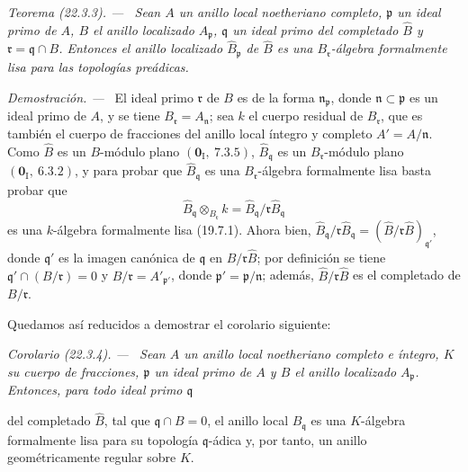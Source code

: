 \documentclass[10pt,oneside]{book}
\makeatletter
\newcommand{\setmanualcurrentlabel}[1]{\def\@currentlabel{#1}}
\newcommand{\oldpage}[2][]{%
  \setcounter{footnote}{0}%
  \marginpar{\scriptsize\textbf{#1}~|~#2}\ignorespaces}
\newenvironment{theorem}[1][]{%
  \setmanualcurrentlabel{#1}\par\medskip\noindent\itshape Teorema (#1). ---\ }{\par}
\newenvironment{corollary}[1][]{%
  \setmanualcurrentlabel{#1}\par\medskip\noindent\itshape Corolario (#1). ---\ }{\par}
\newenvironment{proof}{%
  \par\medskip\noindent\textit{Demostración. ---\ }}{\par}
\makeatother
\begin{document}
\begin{theorem}[22.3.3]
\label{0.22.3.3-es}
Sean $A$ un anillo local noetheriano \textup{completo}, $\mathfrak p$ un ideal primo
de $A$, $B$ el anillo localizado $A_\mathfrak p$, $\mathfrak q$ un ideal
primo del completado $\widehat B$ y $\mathfrak r=\mathfrak q\cap B$.
Entonces el anillo localizado $\widehat B_\mathfrak p$ de $\widehat B$ es una
$B_\mathfrak r$-álgebra formalmente lisa para las topologías preádicas.
\end{theorem}

\begin{proof}
El ideal primo $\mathfrak r$ de $B$ es de la forma
$\mathfrak n_\mathfrak p$, donde $\mathfrak n\subset\mathfrak p$ es un ideal
primo de $A$, y se tiene $B_\mathfrak r=A_\mathfrak n$; sea $k$ el cuerpo
residual de $B_\mathfrak r$, que es también el cuerpo de fracciones del anillo
local íntegro y completo $A'=A/\mathfrak n$. Como $\widehat B$ es un
$B$-módulo plano $(\mathbf 0_\mathrm I,~7.3.5)$,
$\widehat B_\mathfrak q$ es un $B_\mathfrak r$-módulo plano
$(\mathbf 0_\mathrm I,~6.3.2)$, y para probar que
$\widehat B_\mathfrak q$ es una $B_\mathfrak r$-álgebra formalmente lisa
basta probar que
\[
  \widehat B_\mathfrak q\otimes_{B_\mathfrak r}k
  =\widehat B_\mathfrak q/\mathfrak r\widehat B_\mathfrak q
\]
es una $k$-álgebra formalmente lisa (19.7.1). Ahora bien,
$\widehat B_\mathfrak q/\mathfrak r\widehat B_\mathfrak q
=(\widehat B/\mathfrak r\widehat B)_{\mathfrak q'}$, donde $\mathfrak q'$ es
la imagen canónica de $\mathfrak q$ en
$\widehat B/\mathfrak r\widehat B$; por definición se tiene
$\mathfrak q'\cap(B/\mathfrak r)=0$ y
$B/\mathfrak r=A'_{\mathfrak p'}$, donde
$\mathfrak p'=\mathfrak p/\mathfrak n$; además,
$\widehat B/\mathfrak r\widehat B$ es el completado de $B/\mathfrak r$.

Quedamos así reducidos a demostrar el corolario siguiente:
\end{proof}

\begin{corollary}[22.3.4]
\label{0.22.3.4-es}
Sean $A$ un anillo local noetheriano \textup{completo} e íntegro, $K$ su cuerpo de
fracciones, $\mathfrak p$ un ideal primo de $A$ y $B$ el anillo localizado
$A_\mathfrak p$. Entonces, para todo ideal primo $\mathfrak q$

\oldpage[0\textsubscript{IV-1}]{193}

del completado $\widehat B$, tal que $\mathfrak q\cap B=0$, el anillo local
$\widehat B_\mathfrak q$ es una $K$-álgebra formalmente lisa para su topología
$\mathfrak q$-ádica y, por tanto, un anillo geométricamente regular sobre
$K$.
\end{corollary}
\end{document}

